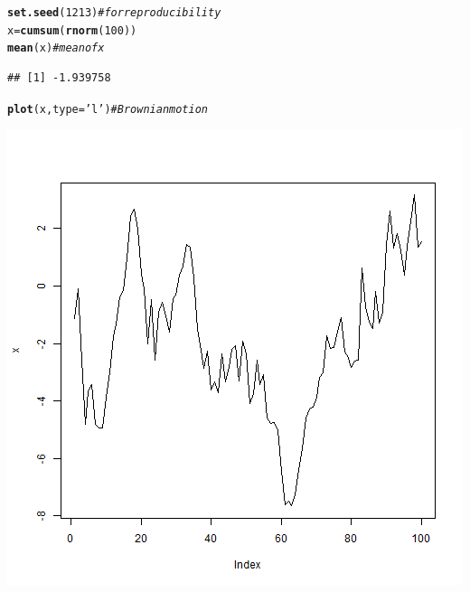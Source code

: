 \documentclass[11pt, twoside, openright, a4paper,xetex]{book}\usepackage[]{graphicx}\usepackage[]{color}
\makeatletter
\def\maxwidth{ %
  \ifdim\Gin@nat@width>\linewidth
    \linewidth
  \else
    \Gin@nat@width
  \fi
}
\newcommand{\hlnum}[1]{\textcolor[rgb]{0.686,0.059,0.569}{#1}}%
\newcommand{\hlstr}[1]{\textcolor[rgb]{0.192,0.494,0.8}{#1}}%
\newcommand{\hlcom}[1]{\textcolor[rgb]{0.678,0.584,0.686}{\textit{#1}}}%
\newcommand{\hlstd}[1]{\textcolor[rgb]{0.345,0.345,0.345}{#1}}%
\newcommand{\hlkwb}[1]{\textcolor[rgb]{0.69,0.353,0.396}{#1}}%
\newcommand{\hlkwc}[1]{\textcolor[rgb]{0.333,0.667,0.333}{#1}}%
\newcommand{\hlkwd}[1]{\textcolor[rgb]{0.737,0.353,0.396}{\textbf{#1}}}%
\newenvironment{kframe}{%
 \def\at@end@of@kframe{}%
 \ifinner\ifhmode%
  \def\at@end@of@kframe{\end{minipage}}%
  \begin{minipage}{\columnwidth}%
 \fi\fi%
 \def\FrameCommand##1{\hskip\@totalleftmargin \hskip-\fboxsep
 \colorbox{shadecolor}{##1}\hskip-\fboxsep
     \hskip-\linewidth \hskip-\@totalleftmargin \hskip\columnwidth}%
 \MakeFramed {\advance\hsize-\width
   \@totalleftmargin\z@ \linewidth\hsize
   \@setminipage}}%
 {\par\unskip\endMakeFramed%
 \at@end@of@kframe}
\newenvironment{knitrout}{}{} %
\makeatother
\begin{document}
\begin{knitrout}
\color{fgcolor}\begin{kframe}
\begin{alltt}
\hlkwd{set.seed}\hlstd{(}\hlnum{1213}\hlstd{)}  \hlcom{# for reproducibility}
\hlstd{x} \hlkwb{=} \hlkwd{cumsum}\hlstd{(}\hlkwd{rnorm}\hlstd{(}\hlnum{100}\hlstd{))}
\hlkwd{mean}\hlstd{(x)}  \hlcom{# mean of x}
\end{alltt}
\begin{verbatim}
## [1] -1.939758
\end{verbatim}
\begin{alltt}
        \hlkwd{plot}\hlstd{(x,} \hlkwc{type} \hlstd{=} \hlstr{'l'}\hlstd{)}  \hlcom{# Brownian motion}
\end{alltt}
\end{kframe}
\includegraphics[width=\maxwidth]{figure/my-label-1} 

\end{knitrout}
\end{document}
